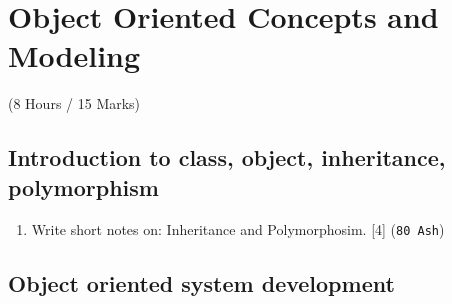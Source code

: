 \documentclass[12pt]{article}
\begin{document}
\section{Object Oriented Concepts and Modeling}
  \begin{center} (8 Hours / 15 Marks) \end{center}

  \subsection{Introduction to class, object, inheritance, polymorphism}
    \begin{enumerate}
      \item Write short notes on: Inheritance and Polymorphosim. \hfill [4] (\texttt{80 Ash})
    \end{enumerate}

  \subsection{Object oriented system development}
\end{document}
